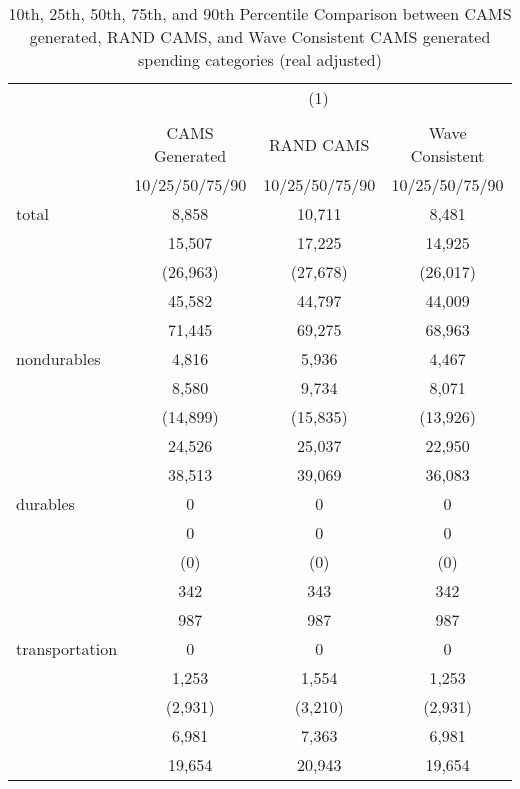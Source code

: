 \begin{table}[htbp]\centering
\def\sym#1{\ifmmode^{#1}\else\(^{#1}\)\fi}
\caption{10th, 25th, 50th, 75th, and 90th Percentile Comparison between CAMS generated, RAND CAMS, and Wave Consistent CAMS generated spending categories (real adjusted)}
\begin{tabular}{l*{3}{c}}
\hline\hline
            &\multicolumn{3}{c}{(1)}               \\
            &\multicolumn{3}{c}{}                  \\
            &CAMS Generated&   RAND CAMS&Wave Consistent\\
            &10/25/50/75/90&10/25/50/75/90&10/25/50/75/90\\
\hline
total       &       8,858&      10,711&       8,481\\
            &      15,507&      17,225&      14,925\\
            &    (26,963)&    (27,678)&    (26,017)\\
            &      45,582&      44,797&      44,009\\
            &      71,445&      69,275&      68,963\\
[1em]
nondurables &       4,816&       5,936&       4,467\\
            &       8,580&       9,734&       8,071\\
            &    (14,899)&    (15,835)&    (13,926)\\
            &      24,526&      25,037&      22,950\\
            &      38,513&      39,069&      36,083\\
[1em]
durables    &           0&           0&           0\\
            &           0&           0&           0\\
            &         (0)&         (0)&         (0)\\
            &         342&         343&         342\\
            &         987&         987&         987\\
[1em]
transportation&           0&           0&           0\\
            &       1,253&       1,554&       1,253\\
            &     (2,931)&     (3,210)&     (2,931)\\
            &       6,981&       7,363&       6,981\\
            &      19,654&      20,943&      19,654\\

\end{tabular}
\end{table}

